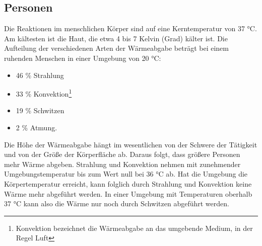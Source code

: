 \subsection{Personen}
\label{subsec:Personen}

Die Reaktionen im menschlichen Körper sind auf eine Kerntemperatur von 37 °C. Am kältesten ist die Haut, die etwa 4 bis 7 Kelvin (Grad) kälter ist. Die Aufteilung der verschiedenen Arten der Wärmeabgabe beträgt bei einem ruhenden Menschen in einer Umgebung von 20 °C:


\begin{itemize}
	\item  46 \% Strahlung
	\item  33 \% Konvektion\footnote[2]{Konvektion bezeichnet die Wärmeabgabe an
		das umgebende Medium, in der Regel Luft}
	\item  19 \% Schwitzen
	\item   2 \% Atmung.
\end{itemize}

Die Höhe der Wärmeabgabe hängt im wesentlichen von der Schwere der Tätigkeit und von der Größe der Körperfläche ab. Daraus folgt, dass größere Personen mehr Wärme abgeben. Strahlung und Konvektion nehmen mit zunehmender Umgebungstemperatur bis zum Wert null bei 36 °C ab. Hat die Umgebung die Körpertemperatur erreicht, kann folglich durch Strahlung und Konvektion keine Wärme mehr abgeführt werden. In einer Umgebung mit Temperaturen oberhalb 37 °C kann also die Wärme nur noch durch Schwitzen abgeführt werden.\protect\cite{MenschWaerme}

